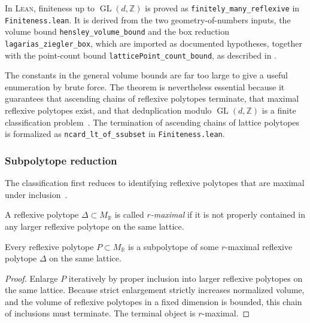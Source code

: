 \documentclass[appliedmath,article,submit,moreauthors]{Definitions/mdpi}
\newcommand{\Z}{\mathbb{Z}}
\newcommand{\GL}{\operatorname{GL}}
\newcommand{\RR}{\mathbb{R}}
\newcommand{\Lean}{\textsc{Lean}}
\begin{document}
In \Lean, finiteness up to \(\GL(d,\Z)\) is proved as
\nolinkurl{finitely\_many\_reflexive} in \nolinkurl{Finiteness.lean}.  It is
derived from the two geometry-of-numbers inputs, the volume bound
\nolinkurl{hensley\_volume\_bound} and the box reduction
\nolinkurl{lagarias\_ziegler\_box}, which are imported as documented hypotheses,
together with the point-count bound \nolinkurl{latticePoint\_count\_bound}, as
described in .

\begin{Remark}
The constants in the general volume bounds are far too large to give a useful
enumeration by brute force.  The theorem is nevertheless essential because it
guarantees that ascending chains of reflexive polytopes terminate, that maximal
reflexive polytopes exist, and that deduplication modulo \(\GL(d,\Z)\) is a
finite classification problem~\cite{KS97,KreuzerSkarke2000}.  The termination of
ascending chains of lattice polytopes is formalized as
\nolinkurl{ncard\_lt\_of\_ssubset} in \nolinkurl{Finiteness.lean}.
\end{Remark}

\subsubsection{Subpolytope reduction}
\label{sec:math-subpolytope}

The classification first reduces to identifying reflexive polytopes that are
maximal under inclusion~\cite{KS97,KreuzerSkarke2000}.

\begin{Definition}
\label{def:rmaximal}
A reflexive polytope \(\Delta\subset M_{\RR}\) is called \emph{\(r\)-maximal} if
it is not properly contained in any larger reflexive polytope on the same
lattice.
\end{Definition}

\begin{Theorem}
\label{thm:embed}
Every reflexive polytope \(P\subset M_{\RR}\) is a subpolytope of some
\(r\)-maximal reflexive polytope \(\Delta\) on the same lattice.
\end{Theorem}

\begin{proof}
Enlarge \(P\) iteratively by proper inclusion into larger reflexive polytopes on
the same lattice. Because strict enlargement strictly increases normalized
volume, and the volume of reflexive polytopes in a fixed dimension is bounded,
this chain of inclusions must terminate. The terminal object is \(r\)-maximal.
\end{proof}
\end{document}
